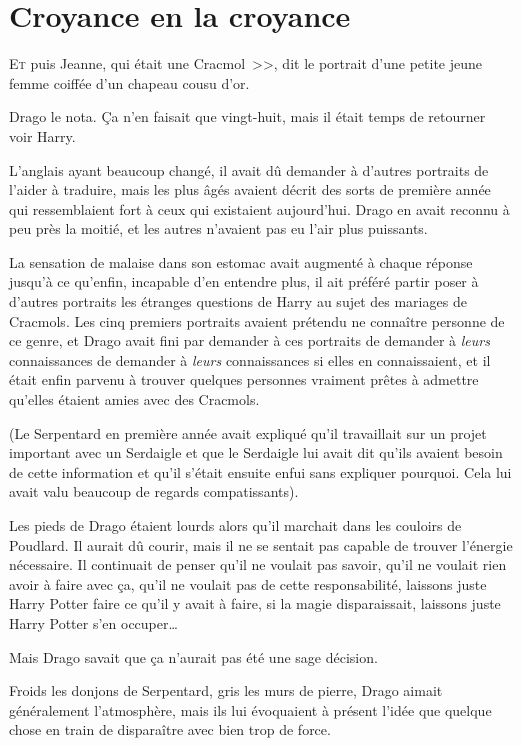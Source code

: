 \chapter{Croyance en la croyance}

\lettrine[ante=<<~]{E}{t} puis Jeanne, qui était une Cracmol~>>, dit le portrait d'une petite jeune femme coiffée d'un chapeau cousu d'or.

Drago le nota. Ça n'en faisait que vingt-huit, mais il était temps de retourner voir Harry.

L'anglais ayant beaucoup changé, il avait dû demander à d'autres portraits de l'aider à traduire, mais les plus âgés avaient décrit des sorts de première année qui ressemblaient fort à ceux qui existaient aujourd'hui. Drago en avait reconnu à peu près la moitié, et les autres n'avaient pas eu l'air plus puissants.

La sensation de malaise dans son estomac avait augmenté à chaque réponse jusqu'à ce qu'enfin, incapable d'en entendre plus, il ait préféré partir poser à d'autres portraits les étranges questions de Harry au sujet des mariages de Cracmols. Les cinq premiers portraits avaient prétendu ne connaître personne de ce genre, et Drago avait fini par demander à ces portraits de demander à \emph{leurs} connaissances de demander à \emph{leurs} connaissances si elles en connaissaient, et il était enfin parvenu à trouver quelques personnes vraiment prêtes à admettre qu'elles étaient amies avec des Cracmols.

(Le Serpentard en première année avait expliqué qu'il travaillait sur un projet important avec un Serdaigle et que le Serdaigle lui avait dit qu'ils avaient besoin de cette information et qu'il s'était ensuite enfui sans expliquer pourquoi. Cela lui avait valu beaucoup de regards compatissants).

Les pieds de Drago étaient lourds alors qu'il marchait dans les couloirs de Poudlard. Il aurait dû courir, mais il ne se sentait pas capable de trouver l'énergie nécessaire. Il continuait de penser qu'il ne voulait pas savoir, qu'il ne voulait rien avoir à faire avec ça, qu'il ne voulait pas de cette responsabilité, laissons juste Harry Potter faire ce qu'il y avait à faire, si la magie disparaissait, laissons juste Harry Potter s'en occuper…

Mais Drago savait que ça n'aurait pas été une sage décision.

Froids les donjons de Serpentard, gris les murs de pierre, Drago aimait généralement l'atmosphère, mais ils lui évoquaient à présent l'idée que quelque chose en train de disparaître avec bien trop de force.

